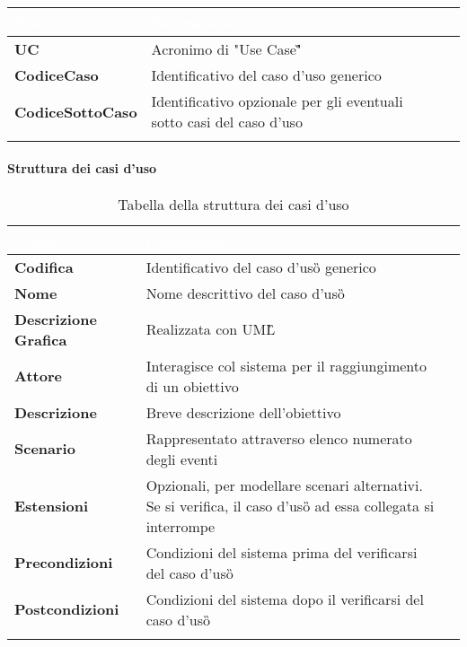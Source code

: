 {
	
	\setlength{\freewidth}{\dimexpr\textwidth-0\tabcolsep}
	\renewcommand{\arraystretch}{1.5}
	\setlength{\aboverulesep}{0pt}
	\setlength{\belowrulesep}{0pt}
	\begin{longtable}{L{.22\freewidth} L{.6\freewidth} L{.080\freewidth}}
		\toprule
		\textcolor{white}{\textbf{Nome}}&
		\textcolor{white}{\textbf{Descrizione}}\\	
		\toprule
		\endhead
		
		\textbf{UC} & Acronimo di "Use Case\G" \\
		\textbf{CodiceCaso} & Identificativo del caso d'uso generico \\
		\textbf{CodiceSottoCaso} & Identificativo opzionale per gli eventuali sotto casi del caso d'uso \\
		
		\bottomrule
		\caption{}
	\end{longtable}
}

\paragraph{Struttura dei casi d'uso}
{
	\setlength{\freewidth}{\dimexpr\textwidth-0\tabcolsep}
	\renewcommand{\arraystretch}{1.5}
	\setlength{\aboverulesep}{0pt}
	\setlength{\belowrulesep}{0pt}
	\begin{longtable}{L{.22\freewidth} L{.6\freewidth} L{.080\freewidth}}
		\toprule
		\textcolor{white}{\textbf{Nome}}&
		\textcolor{white}{\textbf{Descrizione}}\\	
		\toprule
		\endhead
		
		\textbf{Codifica} & Identificativo del caso d'uso\G{} generico \\
		\textbf{Nome} & Nome descrittivo del caso d'uso\G{} \\
		\textbf{Descrizione Grafica} & Realizzata con UML\G\\
		\textbf{Attore} & Interagisce col sistema per il raggiungimento di un obiettivo \\
		\textbf{Descrizione} & Breve descrizione dell'obiettivo \\
		\textbf{Scenario} & Rappresentato attraverso elenco numerato degli eventi \\
		\textbf{Estensioni} & Opzionali, per modellare scenari alternativi. Se si verifica, il caso d'uso\G{} ad essa collegata si interrompe \\
		\textbf{Precondizioni} & Condizioni del sistema prima del verificarsi del caso d'uso\G{} \\
		\textbf{Postcondizioni} & Condizioni del sistema dopo il verificarsi del caso d'uso\G{} \\
		
		\bottomrule
		\caption{Tabella della struttura dei casi d'uso}
	\end{longtable}
}


